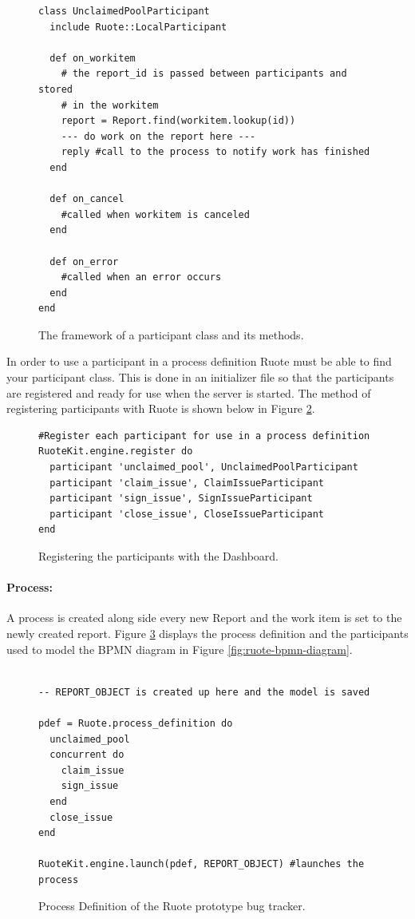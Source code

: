 \documentclass[document.tex]{subfiles}
\begin{document}
\begin{figure}[!ht]
  \begin{lstlisting}
class UnclaimedPoolParticipant
  include Ruote::LocalParticipant

  def on_workitem
    # the report_id is passed between participants and stored
    # in the workitem
    report = Report.find(workitem.lookup(id))
    --- do work on the report here ---
    reply #call to the process to notify work has finished
  end

  def on_cancel
    #called when workitem is canceled
  end

  def on_error
    #called when an error occurs
  end
end
  \end{lstlisting}
  \caption{The framework of a participant class and its methods.}
  \label{fig:ruote-prototype-participant-code}
\end{figure}

In order to use a participant in a process definition Ruote must be able to find your participant class. This is done in an initializer file so that the participants are registered and ready for use when the server is started. The method of registering participants with Ruote is shown below in Figure \ref{fig:ruote-prototype-participant-register}.

\begin{figure}[!ht]
  \begin{lstlisting}
#Register each participant for use in a process definition
RuoteKit.engine.register do
  participant 'unclaimed_pool', UnclaimedPoolParticipant
  participant 'claim_issue', ClaimIssueParticipant
  participant 'sign_issue', SignIssueParticipant
  participant 'close_issue', CloseIssueParticipant
end
  \end{lstlisting}
  \caption{Registering the participants with the Dashboard.}
  \label{fig:ruote-prototype-participant-register}
\end{figure}

\paragraph{Process:} A process is created along side every new Report and the work item is set to the newly created report. Figure \ref{fig:ruote-prototype-process-definition} displays the process definition and the participants used to model the BPMN diagram in Figure \ref{fig:ruote-bpmn-diagram}.

\begin{figure}[!ht]
  \begin{lstlisting}

-- REPORT_OBJECT is created up here and the model is saved

pdef = Ruote.process_definition do
  unclaimed_pool
  concurrent do
    claim_issue
    sign_issue
  end
  close_issue
end

RuoteKit.engine.launch(pdef, REPORT_OBJECT) #launches the process

  \end{lstlisting}
  \caption{Process Definition of the Ruote prototype bug tracker.}
  \label{fig:ruote-prototype-process-definition}
\end{figure}
\end{document}
